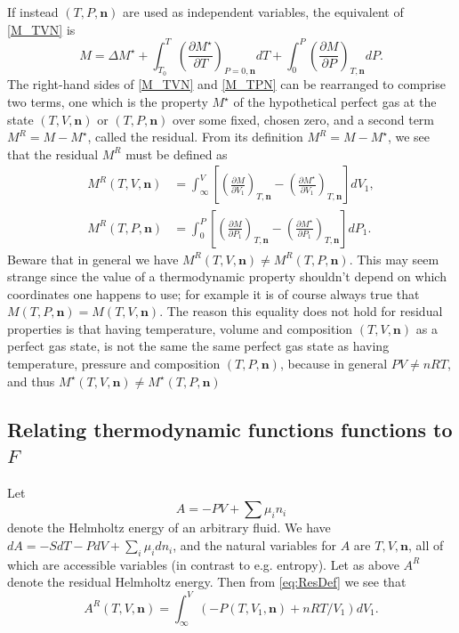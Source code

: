 \documentclass[internal,english]{sintefmemo2012}
\newcommand{\dd}[2]{\frac{\partial #1}{\partial #2}}
\newcommand{\mbn}[0]{\mathbf n}
\newcommand{\lp}{\left(}
\newcommand{\rp}{\right)}
\numberwithin{equation}{section}
\begin{document}
If instead $(T,P,\mbn)$ are used as independent variables, the
equivalent of \eqref{M_TVN} is
\begin{equation}
  \label{M_TPN}
  M = \Delta M^\star + \int_{T_0}^T \lp \frac{\partial M^\star}{\partial
    T} \rp_{P=0,\mbn} dT + \int_{0}^P \lp \frac{\partial M}{\partial P}
  \rp_{T,\mbn} dP.
\end{equation}
The right-hand sides of \eqref{M_TVN} and \eqref{M_TPN} can be
rearranged to comprise two terms, one which is the property $M^\star$
of the hypothetical perfect gas at the state $(T,V,\mbn)$ or
$(T,P,\mbn)$ over some fixed, chosen zero, and a second term $M^R = M
- M^\star$, called the residual. From its definition $M^R = M -
M^\star$, we see that the residual $M^R$ must be defined as
\begin{equation}
  \label{eq:ResDef}
  \begin{aligned}
    M^R(T,V,\mbn) &= \int_\infty^V \left[ \lp \dd{M}{V_1} \rp_{T,\mbn} -
      \lp \dd{M^\star}{V_1} \rp_{T,\mbn} \right] dV_1, \\
    M^R(T,P,\mbn) &= \int_0^P \left[ \lp \dd{M}{P_1} \rp_{T,\mbn} - \lp
      \dd{M^\star}{P_1} \rp_{T,\mbn} \right] dP_1.
  \end{aligned}
\end{equation}
Beware that in general we have $M^R(T,V,\mbn) \neq
M^R(T,P,\mbn)$. This may seem strange since the value of a
thermodynamic property shouldn't depend on which coordinates one
happens to use; for example it is of course always true that
$M(T,P,\mbn) = M(T,V,\mbn)$. The reason this equality does not hold
for residual properties is that having temperature, volume and
composition $(T,V,\mbn)$ as a perfect gas state, is not the same the
same perfect gas state as having temperature, pressure and composition
$(T,P,\mbn)$, because in general $PV \neq nRT$, and thus $M^\star(T,V,\mbn) \neq
M^\star(T,P,\mbn)$

\subsection{Relating thermodynamic functions functions to $F$}
Let
$$
A = -PV + \sum \mu_i n_i
$$
denote the Helmholtz energy of an arbitrary fluid. We have $dA =
-SdT-PdV + \sum_i \mu_i dn_i$, and the natural variables for $A$ are
$T, V, \mbn$, all of which are accessible variables (in contrast to
e.g. entropy). Let as above $A^R$ denote the residual Helmholtz
energy. Then from \eqref{eq:ResDef} we see that
\begin{equation}
  \label{eq:1}
  A^R(T,V,\mbn) = \int_\infty^V \lp -P(T,V_1,\mbn) + nRT/V_1 \rp dV_1.
\end{equation}
\end{document}
